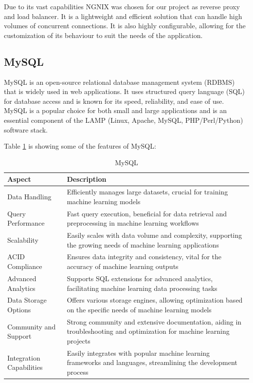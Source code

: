 Due to its vast capabilities NGNIX was chosen for our project as reverse proxy and load balancer. It is a lightweight and efficient solution that can handle high volumes of concurrent connections. It is also highly configurable, allowing for the customization of its behaviour to suit the needs of the application.

\subsection{MySQL}
MySQL is an open-source relational database management system (RDBMS) that is widely used in web applications. It uses structured query language (SQL) for database access and is known for its speed, reliability, and ease of use. MySQL is a popular choice for both small and large applications and is an essential component of the LAMP (Linux, Apache, MySQL, PHP/Perl/Python) software stack.

Table \ref{tab:mysql} is showing some of the features of MySQL\cite{mysql}:

\begin{table}[H]
    \centering
    \begin{tabularx}{\textwidth}{|l|X|}    
        \hline
        \textbf{Aspect} & \textbf{Description} \\
        \hline
        Data Handling & Efficiently manages large datasets, crucial for training machine learning models \\
        \hline
        Query Performance & Fast query execution, beneficial for data retrieval and preprocessing in machine learning workflows \\
        \hline
        Scalability & Easily scales with data volume and complexity, supporting the growing needs of machine learning applications \\
        \hline
        ACID Compliance & Ensures data integrity and consistency, vital for the accuracy of machine learning outputs \\
        \hline
        Advanced Analytics & Supports SQL extensions for advanced analytics, facilitating machine learning data processing tasks \\
        \hline
        Data Storage Options & Offers various storage engines, allowing optimization based on the specific needs of machine learning models \\
        \hline
        Community and Support & Strong community and extensive documentation, aiding in troubleshooting and optimization for machine learning projects \\
        \hline
        Integration Capabilities & Easily integrates with popular machine learning frameworks and languages, streamlining the development process \\
        \hline
\end{tabularx}
\label{tab:mysql}
\caption{MySQL}
\end{table}

